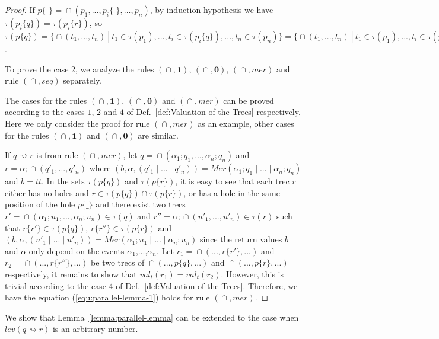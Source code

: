 \documentclass{fcs}
\newcommand{\noth}[0]{\mathbf{1}}
\newcommand{\halt}[0]{\mathbf{0}}
\newcommand{\true}[0]{\mathit{tt}}
\newcommand{\val}[0]{\mathit{val}}
\DeclareMathOperator{\seq}{;}
\DeclareMathOperator{\para}{\cap}
\newcommand{\valt}[0]{\val_t}
\DeclareMathOperator{\sep}{|}
\newcommand{\Merge}[0]{\mathit{Mer}}
\newcommand{\place}[0]{\_}
\newcommand{\red}[0]{\rightsquigarrow}
\newcommand{\lev}[0]{\mathit{lev}}
\begin{document}
\begin{proof}
    If $p\{\place\} = \para(p_1,..., p_i\{\place\}, ..., p_n)$, by induction hypothesis we have $\tau(p_i\{q\}) = \tau(p_i\{r\})$, so
    $\tau(p\{q\}) = \{\para(t_1,...,t_n)\ |\ t_1\in \tau(p_1),...,t_i\in \tau(p_i\{q\}),...,t_n\in \tau(p_n)\} = \{\para(t_1,...,t_n)\ |\ t_1\in \tau(p_1),...,t_i\in \tau(p_i\{r\}),...,t_n\in \tau(p_n)\} = \tau(p\{r\})$.

    To prove the case 2, we analyze the rules $(\para, \noth)$, $(\para, \halt)$, $(\para, \mathit{mer})$ and rule $(\para,\mathit{seq})$ separately.

    The cases for the rules $(\para, \noth)$, $(\para, \halt)$ and $(\para, \mathit{mer})$ can be proved according to the cases $1$, $2$ and $4$ of Def.~\ref{def:Valuation of the Trecs} respectively.
    Here we only consider the proof for rule $(\para, \mathit{mer})$ as an example, other cases for the rules $(\para, \noth)$ and $(\para, \halt)$ are similar.

    If $q\red r$ is from rule $(\para, \mathit{mer})$, let $q = \para(\alpha_1\seq q_1,..., \alpha_n\seq q_n)$ and $r = \alpha\seq \para(q'_1,...,q'_n)$ where $(b, \alpha, (q'_1\sep...\sep q'_n)) = \Merge(\alpha_1\seq q_1\sep...\sep \alpha_n\seq q_n)$ and $b=\true$.
    In the sets $\tau(p\{q\})$ and $\tau(p\{r\})$, it is easy to see that each trec $r$ either has no holes and $r\in \tau(p\{q\})\cap \tau(p\{r\})$, or
    has a hole in the same position of the hole $p\{\place\}$ and there exist two trecs $r' = \para(\alpha_1\seq u_1,...,\alpha_n\seq u_n) \in \tau(q)$ and $r'' = \alpha\seq \para(u'_1,...,u'_n)\in \tau(r)$ such that
    $r\{r'\} \in \tau(p\{q\})$, $r\{r''\}\in \tau(p\{r\})$ and $(b,\alpha, (u'_1\sep...\sep u'_n)) = \Merge(\alpha_1\seq u_1\sep...\sep\alpha_n\seq u_n)$ since the return values $b$ and $\alpha$ only depend on the events $\alpha_1$,...,$\alpha_n$.
    Let $r_1 = \para(...,r\{r'\},...)$ and $r_2 = \para(..., r\{r''\},...)$ be two trecs of $\para(...,p\{q\},...)$ and $\para(...,p\{r\},...)$ respectively,
    it remains to show that $\valt(r_1)=\valt(r_2)$.
    However, this is trivial according to the case 4 of Def.~\ref{def:Valuation of the Trecs}.
    Therefore, we have the equation (\ref{equ:parallel-lemma-1}) holds for rule $(\para, \mathit{mer})$.

\end{proof}

We show that Lemma~\ref{lemma:parallel-lemma} can be extended to the case when $\lev(q\red r)$ is an arbitrary number.
\end{document}

